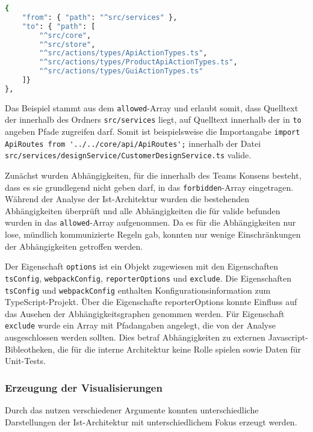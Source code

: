 \begin{lstlisting}[language={sh}, label=depcruise-example, caption=Beispiel einer Abhängigkeitesrelation]
{
    "from": { "path": "^src/services" },
    "to": { "path": [
        "^src/core",
        "^src/store",
        "^src/actions/types/ApiActionTypes.ts",
        "^src/actions/types/ProductApiActionTypes.ts",
        "^src/actions/types/GuiActionTypes.ts"
    ]}
},
\end{lstlisting}
Das Beispiel stammt aus dem \lstinline|allowed|-Array und erlaubt somit, dass Quelltext der innerhalb des Ordners \lstinline|src/services| liegt, auf Quelltext innerhalb der in \lstinline|to| angeben Pfade zugreifen darf. 
Somit ist beispielsweise die Importangabe \newline  
\glqq\lstinline|import ApiRoutes from '../../core/api/ApiRoutes';|\grqq \newline
innerhalb der Datei \lstinline|src/services/designService/CustomerDesignService.ts| valide.

Zunächst wurden Abhängigkeiten, für die innerhalb des Teams Konsens besteht, dass es sie grundlegend nicht geben darf, in das \lstinline|forbidden|-Array eingetragen. Während der Analyse der Ist-Architektur wurden die bestehenden Abhängigkeiten überprüft und alle Abhängigkeiten die für valide befunden wurden in das \lstinline|allowed|-Array aufgenommen. Da es für die Abhängigkeiten nur lose, mündlich kommunizierte Regeln gab, konnten nur wenige Einschränkungen der Abhängigkeiten getroffen werden.  
 
Der Eigenschaft \lstinline|options| ist ein Objekt zugewiesen mit den Eigenschaften 
\lstinline|tsConfig|, 
\lstinline|webpackConfig|, 
\lstinline|reporterOptions| und 
\lstinline|exclude|. Die Eigenschaften \lstinline|tsConfig| und \lstinline|webpackConfig| enthalten Konfigurationsinformation zum TypeScript-Projekt. Über die Eigenschafte reporterOptions konnte Einfluss auf das Ausehen der Abhängigkeitsgraphen genommen werden. Für Eigenschaft \lstinline|exclude| wurde ein Array mit Pfadangaben angelegt, die von der Analyse ausgeschlossen werden sollten. Dies betraf Abhängigkeiten zu externen Javascript-Bibleotheken, die für die interne Architektur keine Rolle spielen sowie Daten für Unit-Tests. 

\subsubsection{Erzeugung der Visualisierungen}
Durch das nutzen verschiedener Argumente konnten unterschiedliche Darstellungen der Ist-Architektur mit unterschiedlichem Fokus erzeugt werden. 


